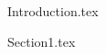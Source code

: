 \documentclass[12pt,a4paper,titlepage]{article}
\begin{document}
\pagestyle{empty}%
\preambule{}

\pagestyle{main}%

{Introduction.tex}
\clearpage{}



{Section1.tex}
\clearpage{}


\end{document}

